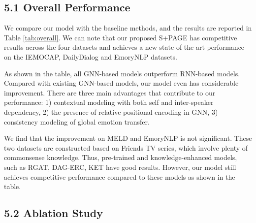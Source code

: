 \documentclass[letterpaper]{article} \usepackage{aaai22}  \usepackage{times}  \usepackage{helvet}  \usepackage{courier}  \usepackage[hyphens]{url}  \usepackage{graphicx} \urlstyle{rm} \def\UrlFont{\rm}  \usepackage{natbib}  \usepackage{caption} \DeclareCaptionStyle{ruled}{labelfont=normalfont,labelsep=colon,strut=off} \frenchspacing  \setlength{\pdfpagewidth}{8.5in}  \setlength{\pdfpageheight}{11in}  \usepackage{algorithm}
\begin{document}
\subsection{5.1 Overall Performance}
We compare our model with the baseline methods, and the results are reported in Table \ref{tab:overall}. We can note that our proposed S+PAGE has competitive results across the four datasets and achieves a new state-of-the-art performance on the IEMOCAP, DailyDialog and EmoryNLP datasets. 

As shown in the table, all GNN-based models outperform RNN-based models. Compared with existing GNN-based models, our model even has considerable improvement. There are three main advantages that contribute to our performance:  1) contextual modeling with both self and inter-speaker dependency, 2) the presence of relative positional encoding in GNN, 3) consistency modeling of global emotion transfer.



We find that the improvement on MELD and EmoryNLP is not significant. These two datasets are constructed based on Friends TV series, which involve plenty of commonsense knowledge. Thus, pre-trained and knowledge-enhanced models, such as RGAT, DAG-ERC, KET have good results.
However, our model still achieves competitive performance compared to these models as shown in the table.



\subsection{5.2 Ablation Study}

\begin{table}[b]
	\centering
	\caption{Results of ablation study.}
	\label{tab:ablation}
\end{table}
\end{document}
